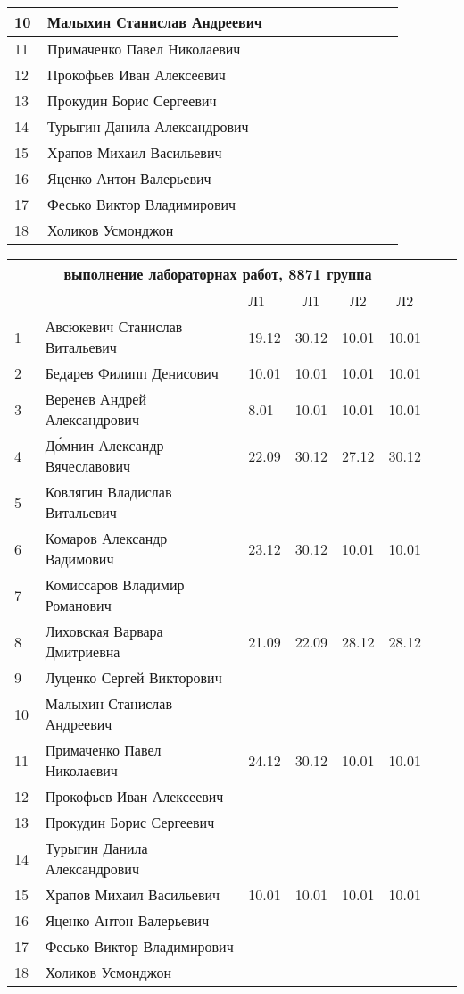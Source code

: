 \documentclass[a4paper,11pt]{article}
\newcommand*\ok{&{\small \ding{51}}} %
\newcommand*\no{&{\small }} %
\begin{document}
\begin{tabular}{p{7pt}|l|p{\CS}|p{\CS}|p{\CS}|p{\CS}|p{\CS}|p{\CS}|p{\CS}|p{\CS}|p{\CS}}
10\,&  Малыхин Станислав Андреевич      \no\no\no&&&&&\\
\midrule
11\,&  Примаченко Павел Николаевич      \no\ok\ok&&&&&\\
12\,&  Прокофьев Иван Алексеевич        \no\no\no&&&&&\\
13\,&  Прокудин Борис Сергеевич         \no\ok\ok&&&&&\\
14\,&  Турыгин Данила Александрович     \no\no\no&&&&\\
15\,&  Храпов Михаил Васильевич         \ok\ok\no&&&&\\
\midrule
16\,&  Яценко Антон Валерьевич          \no\ok\no&&&&&\\
17\,&  Фесько Виктор Владимирович       \no\no\no&&&&&\\
18\,&Холиков Усмонджон                  \no\no\ok&&&&&\\ 
\bottomrule
\end{tabular} 

\newpage
%
\begin{tabular}{l|llc|cccc}
\multicolumn{6}{c}{выполнение лабораторнах работ, 8871 группа} \\
\toprule
&&Л1&Л1& Л2&Л2\\
\midrule
1\,&  Авсюкевич Станислав Витальевич    &19.12& 30.12& 10.01& 10.01\\
2\,&  Бедарев Филипп Денисович          &10.01& 10.01& 10.01& 10.01\\
3\,&  Веренев Андрей Александрович      & 8.01& 10.01& 10.01& 10.01\\
4\,&  Д\'{о}мнин Александр Вячеславович &22.09& 30.12& 27.12& 30.12\\
5\,&   Ковлягин Владислав Витальевич    &&&&\\
\midrule
6\,&  Комаров Александр Вадимович       &23.12& 30.12& 10.01& 10.01\\
7\,&  Комиссаров Владимир Романович     &&&&\\
8\,&  Лиховская Варвара Дмитриевна      &21.09& 22.09& 28.12& 28.12\\
9\,&   Луценко Сергей Викторович        &&&&\\
10\,&  Малыхин Станислав Андреевич      &&&&\\
\midrule
11\,&  Примаченко Павел Николаевич      &24.12& 30.12& 10.01& 10.01\\
12\,&  Прокофьев Иван Алексеевич        &&&&\\
13\,&  Прокудин Борис Сергеевич         &&&&\\
14\,&  Турыгин Данила Александрович     &&&\\
15\,&  Храпов Михаил Васильевич         &10.01& 10.01& 10.01& 10.01\\
\midrule
16\,&  Яценко Антон Валерьевич          &&&&\\
17\,&  Фесько Виктор Владимирович       &&&&\\
18\,&Холиков Усмонджон                  &&&&\\
\bottomrule
\end{tabular}
\end{document}
